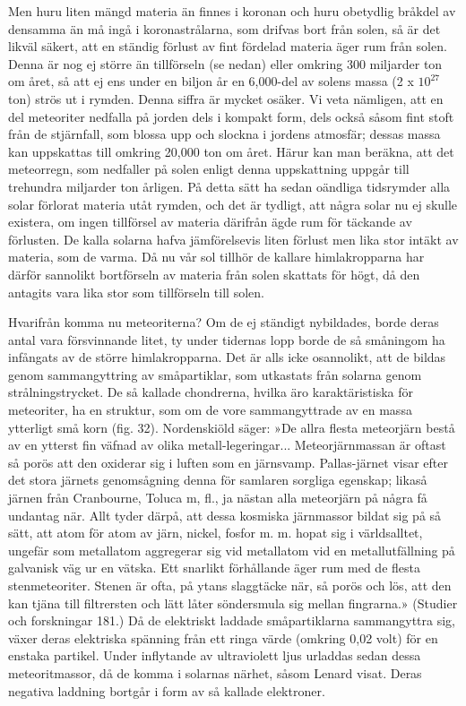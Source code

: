 \documentclass[a4paper, 12pt, oneside, swedish]{article}
\begin{document}
Men huru liten mängd materia än finnes i koronan och huru obetydlig bråkdel av densamma än må ingå i koronastrålarna, som drifvas bort från solen, så är det likväl säkert, att en ständig förlust av fint fördelad materia äger rum från solen. Denna är nog ej större än tillförseln (se nedan) eller omkring 300 miljarder ton om året, så att ej ens under en biljon år en 6,000-del av solens massa (2 x $10^{27}$ ton) strös ut i rymden. Denna siffra är mycket osäker. Vi veta nämligen, att en del meteoriter nedfalla på jorden dels i kompakt form, dels också såsom fint stoft från de stjärnfall, som blossa upp och slockna i jordens atmosfär; dessas massa kan uppskattas till omkring 20,000 ton om året. Härur kan man beräkna, att det meteorregn, som nedfaller på solen enligt denna uppskattning uppgår till trehundra miljarder ton årligen. På detta sätt ha sedan oändliga tidsrymder alla solar förlorat materia utåt rymden, och det är tydligt, att några solar nu ej skulle existera, om ingen tillförsel av materia därifrån ägde rum för täckande av förlusten. De kalla solarna hafva jämförelsevis liten förlust men lika stor intäkt av materia, som de varma. Då nu vår sol tillhör de kallare himlakropparna har därför sannolikt bortförseln av materia från solen skattats för högt, då den antagits vara lika stor som tillförseln till solen.

Hvarifrån komma nu meteoriterna? Om de ej ständigt nybildades, borde deras antal vara försvinnande litet, ty under tidernas lopp borde de så småningom ha infångats av de större himlakropparna. Det är alls icke osannolikt, att de bildas genom sammangyttring av småpartiklar, som utkastats från solarna genom strålningstrycket. De så kallade chondrerna, hvilka äro karaktäristiska för meteoriter, ha en struktur, som om de vore sammangyttrade av en massa ytterligt små korn (fig. 32). Nordenskiöld säger: »De allra flesta meteorjärn bestå av en ytterst fin väfnad av olika metall-legeringar... Meteorjärnmassan är oftast så porös att den oxiderar sig i luften som en järnsvamp. Pallas-järnet visar efter det stora järnets genomsågning denna för samlaren sorgliga egenskap; likaså järnen från Cranbourne, Toluca m, fl., ja nästan alla meteorjärn på några få undantag när. Allt tyder därpå, att dessa kosmiska järnmassor bildat sig på så sätt, att atom för atom av järn, nickel, fosfor m. m. hopat sig i världsalltet, ungefär som metallatom aggregerar sig vid metallatom vid en metallutfällning på galvanisk väg ur en vätska. Ett snarlikt förhållande äger rum med de flesta stenmeteoriter. Stenen är ofta, på ytans slaggtäcke när, så porös och lös, att den kan tjäna till filtrersten och lätt låter söndersmula sig mellan fingrarna.» (Studier och forskningar 181.) Då de elektriskt laddade småpartiklarna sammangyttra sig, växer deras elektriska spänning från ett ringa värde (omkring 0,02 volt) för en enstaka partikel. Under inflytande av ultraviolett ljus urladdas sedan dessa meteoritmassor, då de komma i solarnas närhet, såsom Lenard visat. Deras negativa laddning bortgår i form av så kallade elektroner.
\end{document}
